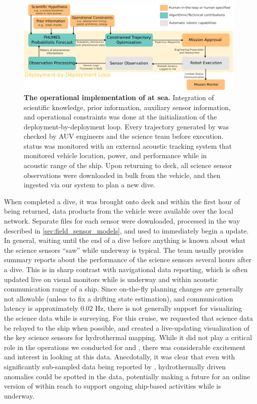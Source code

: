 \begin{figure}[h!]
    \centering
    \includegraphics[width=1.0\columnwidth]{figures/deployment_loop.png}
    \caption[The operational implementation of \PHORTEX at sea.]{\textbf{The operational implementation of \PHORTEX at sea.} Integration of scientific knowledge, prior information, auxiliary sensor information, and operational constraints was done at the initialization of the \PHORTEX deployment-by-deployment loop. Every trajectory generated by \PHORTEX was checked by AUV \Sentry engineers and the science team before execution. \Sentry status was monitored with an external acoustic tracking system that monitored vehicle location, power, and performance while in acoustic range of the ship. Upon returning to deck, all science sensor observations were downloaded in bulk from the vehicle, and then ingested via our \PHORTEX system to plan a new dive.}
    \label{fig:at_sea_ops}
\end{figure}

When \Sentry completed a dive, it was brought onto deck and within the first hour of being returned, data products from the vehicle were available over the \Sentry local network. Separate files for each sensor were downloaded, processed in the way described in \cref{sec:field_sensor_models}, and used to immediately begin a \PHUMES update. In general, waiting until the end of a dive before anything is known about what the science sensors ``saw'' while underway is typical. The \Sentry team usually provides summary reports about the performance of the science sensors several hours after a dive. This is in sharp contrast with navigational data reporting, which is often updated live on visual monitors while \Sentry is underway and within acoustic communication range of a ship. Since on-the-fly planning changes are generally not allowable (unless to fix a drifting \Sentry state estimation), and communication latency is approximately 0.02 Hz, there is not generally support for visualizing the science data while \Sentry is surveying. For this cruise, we requested that science data be relayed to the ship when possible, and created a live-updating visualization of the key science sensors for hydrothermal mapping. While it did not play a critical role in the operations we conducted for \PHUMES and \PHORTEX, there was considerable excitement and interest in looking at this data. Anecdotally, it was clear that even with significantly sub-sampled data being reported by \Sentry, hydrothermally driven anomalies could be spotted in the data, potentially making a future for an online version of \PHUMES within reach to support ongoing ship-based activities while \Sentry is underway. 


